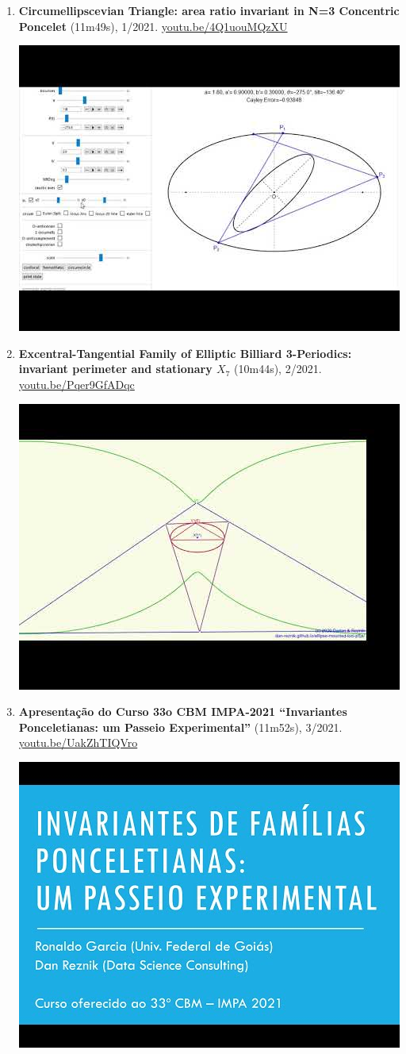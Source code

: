 \documentclass[12pt]{article}
\begin{document}
\begin{enumerate}[resume]
% 
\item \textbf{Circumellipscevian Triangle: area ratio invariant in N=3 Concentric Poncelet} (11m49s), 1/2021. \href{https://youtu.be/4Q1uouMQzXU}{\url{youtu.be/4Q1uouMQzXU}}
\begin{center}\includegraphics[width=.5\textwidth]{pics/4Q1uouMQzXU.jpg}\end{center}
% 
\item \textbf{Excentral-Tangential Family of Elliptic Billiard 3-Periodics: invariant perimeter and stationary $X_{7}$} (10m44s), 2/2021. \href{https://youtu.be/Pqer9GfADqc}{\url{youtu.be/Pqer9GfADqc}}
\begin{center}\includegraphics[width=.5\textwidth]{pics/Pqer9GfADqc.jpg}\end{center}
% 
\item \textbf{Apresentação do Curso 33o CBM IMPA-2021
``Invariantes Ponceletianas: um Passeio Experimental''} (11m52s), 3/2021. \href{https://youtu.be/UakZhTIQVro}{\url{youtu.be/UakZhTIQVro}}
\begin{center}\includegraphics[width=.5\textwidth]{pics/UakZhTIQVro.jpg}\end{center}

\end{enumerate}
\end{document}
